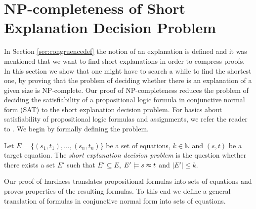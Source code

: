 \section{NP-completeness of Short Explanation Decision Problem}
\label{sec:npcomplete}
In Section \ref{sec:congruencedef} the notion of an explanation is defined and it was mentioned that we want to find short explanations in order to compress proofs.
In this section we show that one might have to search a while to find the shortest one, by proving that the problem of deciding whether there is an explanation of a given size is NP-complete.
Our proof of NP-completeness reduces the problem of deciding the satisfiability of a propositional logic formula  in conjunctive normal form (SAT) to the short explanation decision problem.
For basics about satisfiability of propositional logic formulas and assignments, we refer the reader to \cite{Biere2009}.
We begin by formally defining the problem.

\begin{definition}

Let $E = \{(s_1,t_1),\ldots,(s_n,t_n)\}$ be a set of equations, $k \in \mathbb{N}$ and $(s,t)$ be a target equation.
The \emph{short explanation decision problem} is the question whether there exists a set $E'$ such that $E' \subseteq E$, $E' \models s \thickapprox t$ and $|E'| \leq k$.

\end{definition}

Our proof of hardness translates propositional formulas into sets of equations and proves properties of the resulting formulas.
To this end we define a general translation of formulas in conjunctive normal form into sets of equations.

